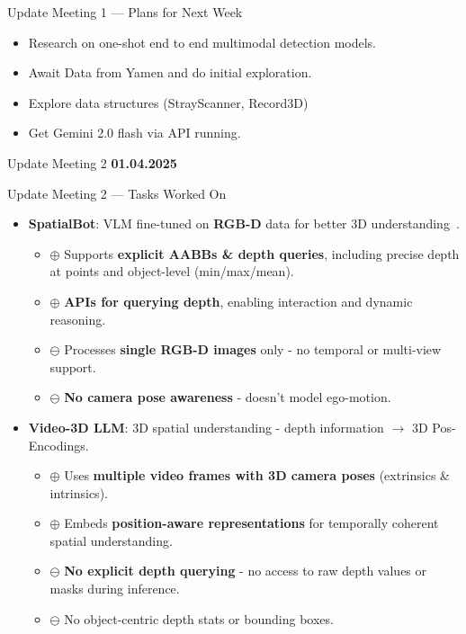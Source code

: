 \documentclass[aspectratio=169,xcolor=dvipsnames]{beamer}
\newcommand{\framedate}[1]{\def\currentframedate{#1}}
\begin{document}
\framedate{27.03.2025}
\begin{frame}{Update Meeting 1 --- Plans for Next Week}
\begin{itemize}
    \item Research on one-shot end to end multimodal detection models.
    \item Await Data from Yamen and do initial exploration.
    \item Explore data structures (StrayScanner, Record3D)
    \item Get Gemini 2.0 flash via API running.
\end{itemize}

\end{frame}

\framedate{01.04.2025}
\begin{frame}{Update Meeting 2}
\textbf{01.04.2025} \\
\end{frame}

\framedate{01.04.2025}
\begin{frame}{Update Meeting 2 --- Tasks Worked On}
\begin{itemize}
  \item \textbf{SpatialBot}: VLM fine-tuned on \textbf{RGB-D} data for better 3D understanding~\cite{cai2025spatialbotprecisespatialunderstanding}.
  \begin{itemize}
    \item \( \oplus \) Supports \textbf{explicit AABBs \& depth queries}, including precise depth at points and object-level (min/max/mean).
    \item \( \oplus \) \textbf{APIs for querying depth}, enabling interaction and dynamic reasoning.
    \item \( \ominus \) Processes \textbf{single RGB-D images} only - no temporal or multi-view support.
    \item \( \ominus \) \textbf{No camera pose awareness} - doesn't model ego-motion.
  \end{itemize}
  \item \textbf{Video-3D LLM}: 3D spatial understanding - depth information \( \rightarrow \) 3D Pos-Encodings.
  \begin{itemize}
    \item \( \oplus \) Uses \textbf{multiple video frames with 3D camera poses} (extrinsics \& intrinsics).
    \item \( \oplus \) Embeds \textbf{position-aware representations} for temporally coherent spatial understanding.
    \item \( \ominus \) \textbf{No explicit depth querying} - no access to raw depth values or masks during inference.
    \item \( \ominus \) No object-centric depth stats or bounding boxes.
  \end{itemize}
\end{itemize}
\end{frame}
\end{document}
